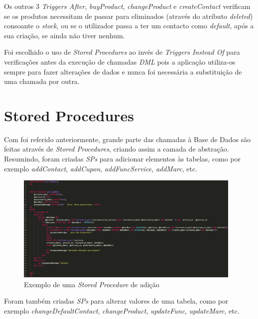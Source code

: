 \documentclass[10pt,portuguese]{article}
\begin{document}
\par Os outros 3 \textit{Triggers After}, \textit{buyProduct}, \textit{changeProduct} e \textit{createContact} verificam se os produtos necessitam de passar para eliminados (através do atributo \textit{deleted}) consoante o \textit{stock}, ou se o utilizador passa a ter um contacto como \textit{default}, após a sua criação, se ainda não tiver nenhum.

\par Foi escolhido o uso de \textit{Stored Procedures} ao invés de \textit{Triggers Instead Of} para verificações antes da execução de chamadas \textit{DML} pois a aplicação utiliza-os sempre para fazer alterações de dados e nunca foi necessária a substituição de uma chamada por outra.

\clearpage

\section{Stored Procedures}

\par Com foi referido anteriormente, grande parte das chamadas à Base de Dados são feitas através de \textit{Stored Procedures}, criando assim a camada de abstração. Resumindo, foram criadas \textit{SPs} para adicionar elementos às tabelas, como por exemplo \textit{addContact}, \textit{addCupon}, \textit{addFuncService}, \textit{addMarc}, etc.

\begin{figure}[!h]
    \centering
    \includegraphics[width=410]{images/addMarc.png}
    \caption{Exemplo de uma \textit{Stored Procedure} de adição}
\end{figure}


\par Foram também criadas \textit{SPs} para alterar valores de uma tabela, como por exemplo \textit{changeDefaultContact}, \textit{changeProduct}, \textit{updateFunc}, \textit{updateMarc}, etc.
\end{document}
